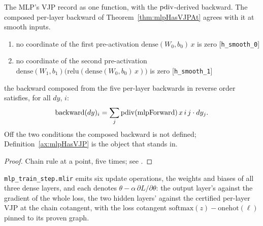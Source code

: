 \begin{definition}
  \label{ax:mlpHasVJP}
  \leanok
  The MLP's VJP record as one function, with the \(\operatorname{pdiv}\)-derived
  backward. The composed per-layer backward of
  Theorem~\ref{thm:mlpHasVJPAt} agrees with it at smooth inputs.
\end{definition}

\begin{theorem}
  \label{thm:mlpHasVJPAt}
  \leanok
  \Assume{}
  \begin{enumerate}
    \item no coordinate of the first pre-activation
          \(\mathrm{dense}(W_0, b_0)\, x\) is zero
          \hfill[\texttt{h\_smooth\_0}]
    \item no coordinate of the second pre-activation
          \(\mathrm{dense}(W_1, b_1)\bigl(\mathrm{relu}(\mathrm{dense}(W_0, b_0)\, x)\bigr)\)
          is zero \hfill[\texttt{h\_smooth\_1}]
  \end{enumerate}
  \Prove{} the backward composed from the five per-layer backwards in
  reverse order satisfies, for all \(dy\), \(i\):
  \[
    \mathrm{backward}(dy)_i
      = \sum_j \operatorname{pdiv}(\mathrm{mlpForward})\, x\, i\, j \cdot dy_j .
  \]
  Off the two conditions the composed backward is not defined;
  Definition~\ref{ax:mlpHasVJP} is the object that stands in.
\end{theorem}

\begin{proof}
\leanok
Chain rule at a point, five times; see
.
\end{proof}

\begin{theorem}
  \label{thm:mlp_fold}
  \leanok
  \Prove{} \texttt{mlp\_train\_step.mlir} emits six update operations, the
  weights and biases of all three dense layers, and each denotes
  \(\theta - \alpha\,\partial L/\partial\theta\): the output layer's against the
  gradient of the whole loss, the two hidden layers' against the certified
  per-layer VJP at the chain cotangent, with the loss cotangent
  \(\mathrm{softmax}(z) - \mathrm{onehot}(\ell)\) pinned to its proven graph.
\end{theorem}

